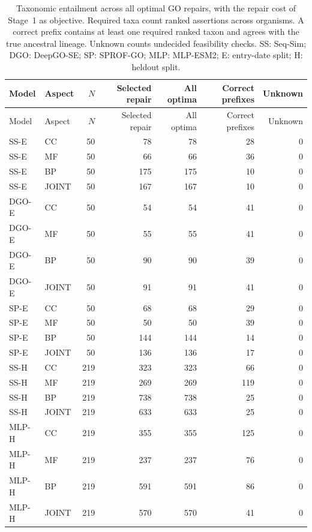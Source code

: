 \begingroup\scriptsize
\setlength{\tabcolsep}{4pt}
\begin{longtable}{llrrrrr}
\caption{Taxonomic entailment across all optimal GO repairs, with the repair cost of Stage~1 as objective. Required taxa count ranked assertions across organisms. A correct prefix contains at least one required ranked taxon and agrees with the true ancestral lineage. Unknown counts undecided feasibility checks. SS: Seq-Sim; DGO: DeepGO-SE; SP: SPROF-GO; MLP: MLP-ESM2; E: entry-date split; H: heldout split.}\label{tab:supp-optimal-lineage}\\
\toprule
Model & Aspect & $N$ & Selected repair & All optima & Correct prefixes & Unknown \\
\midrule
\endfirsthead
\toprule
Model & Aspect & $N$ & Selected repair & All optima & Correct prefixes & Unknown \\
\midrule
\endhead
SS-E & CC & 50 & 78 & 78 & 28 & 0 \\
SS-E & MF & 50 & 66 & 66 & 36 & 0 \\
SS-E & BP & 50 & 175 & 175 & 10 & 0 \\
SS-E & JOINT & 50 & 167 & 167 & 10 & 0 \\
DGO-E & CC & 50 & 54 & 54 & 41 & 0 \\
DGO-E & MF & 50 & 55 & 55 & 41 & 0 \\
DGO-E & BP & 50 & 90 & 90 & 39 & 0 \\
DGO-E & JOINT & 50 & 91 & 91 & 41 & 0 \\
SP-E & CC & 50 & 68 & 68 & 29 & 0 \\
SP-E & MF & 50 & 50 & 50 & 39 & 0 \\
SP-E & BP & 50 & 144 & 144 & 14 & 0 \\
SP-E & JOINT & 50 & 136 & 136 & 17 & 0 \\
SS-H & CC & 219 & 323 & 323 & 66 & 0 \\
SS-H & MF & 219 & 269 & 269 & 119 & 0 \\
SS-H & BP & 219 & 738 & 738 & 25 & 0 \\
SS-H & JOINT & 219 & 633 & 633 & 25 & 0 \\
MLP-H & CC & 219 & 355 & 355 & 125 & 0 \\
MLP-H & MF & 219 & 237 & 237 & 76 & 0 \\
MLP-H & BP & 219 & 591 & 591 & 86 & 0 \\
MLP-H & JOINT & 219 & 570 & 570 & 41 & 0 \\
\bottomrule
\end{longtable}
\endgroup
